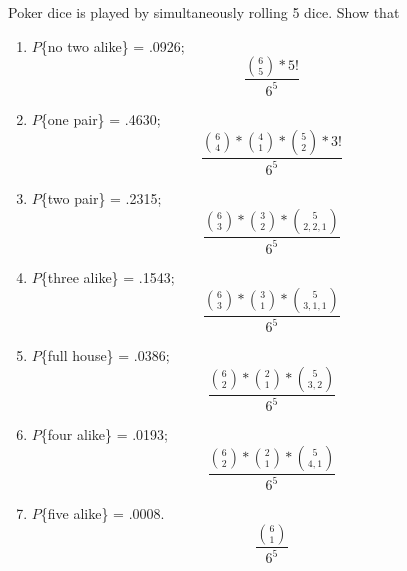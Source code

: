 \item Poker dice is played by simultaneously rolling 5 dice. Show that
\begin{enumerate}
    \item $P$\{no two alike\} = .0926;
    \[ \frac{\binom{6}{5} * 5!}{6^5} \]
    \item $P$\{one pair\} = .4630;
    \[ \frac{\binom{6}{4} * \binom{4}{1} * \binom{5}{2} * 3!}{6^5} \]
    \item $P$\{two pair\} = .2315;
    \[ \frac{\binom{6}{3} * \binom{3}{2} * \binom{5}{2,2,1}}{6^5} \]
    \item $P$\{three alike\} = .1543;
    \[ \frac{\binom{6}{3} * \binom{3}{1} * \binom{5}{3,1,1}}{6^5} \]
    \item $P$\{full house\} = .0386;
    \[ \frac{\binom{6}{2} * \binom{2}{1} * \binom{5}{3,2}}{6^5} \]
    \item $P$\{four alike\} = .0193;
    \[ \frac{\binom{6}{2} * \binom{2}{1} * \binom{5}{4,1}}{6^5} \]
    \item $P$\{five alike\} = .0008.
    \[ \frac{\binom{6}{1}}{6^5} \]
\end{enumerate}